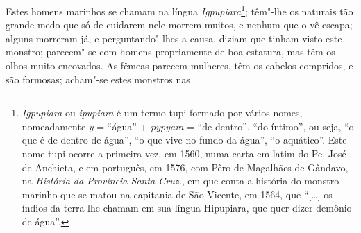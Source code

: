 Estes homens marinhos se chamam na língua \textit{Igpupiara}\footnote{ \textit{Igpupiara} 
ou \textit{ipupiara} é um termo tupi
formado por vários nomes, nomeadamente \textit{y} = ``água'' +
\textit{pypyara} = ``de dentro'', ``do íntimo'', ou seja, ``o que é de
dentro de água'', ``o que vive no fundo da água'', ``o aquático''. Este
nome tupi ocorre a primeira vez, em 1560, numa carta em latim do Pe.
José de Anchieta, e em português, em 1576, com Pêro de Magalhães de Gândavo,
na \textit{História da Província Santa Cruz.}, em que conta a
história do monstro marinho que se matou na capitania de São Vicente,
em 1564, que ``[\ldots] os índios da terra lhe chamam em sua língua
Hipupiara, que quer dizer demônio de água''.}; têm"-lhe os naturais tão
grande medo que só de cuidarem nele morrem muitos, e nenhum que o vê
escapa; alguns morreram já, e perguntando"-lhes a causa, diziam que
tinham visto este monstro; parecem"-se com homens propriamente de boa
estatura, mas têm os olhos muito encovados. As fêmeas parecem mulheres,
têm os cabelos compridos, e são formosas; acham"-se estes monstros nas
